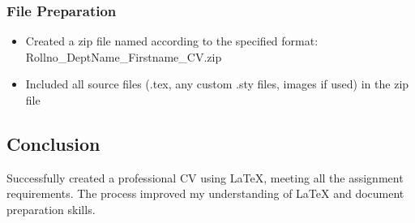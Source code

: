 \subsubsection{File Preparation}
\begin{itemize}
    \item Created a zip file named according to the specified format: Rollno\_DeptName\_Firstname\_CV.zip
    \item Included all source files (.tex, any custom .sty files, images if used) in the zip file
\end{itemize}

\subsection{Conclusion}
Successfully created a professional CV using LaTeX, meeting all the assignment requirements. The process improved my understanding of LaTeX and document preparation skills.
